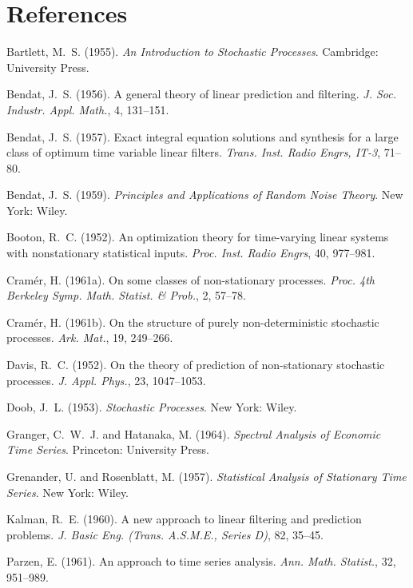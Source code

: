 \documentclass[11pt]{article}
\begin{document}
\section*{References}
\begin{thebibliography}{99}
Bartlett, M.~S. (1955). \emph{An Introduction to Stochastic Processes}. Cambridge: University Press.

Bendat, J.~S. (1956). A general theory of linear prediction and filtering. \emph{J. Soc. Industr. Appl. Math.}, 4, 131--151.

Bendat, J.~S. (1957). Exact integral equation solutions and synthesis for a large class of optimum time variable linear filters. \emph{Trans. Inst. Radio Engrs, IT-3}, 71--80.

Bendat, J.~S. (1959). \emph{Principles and Applications of Random Noise Theory}. New York: Wiley.

Booton, R.~C. (1952). An optimization theory for time-varying linear systems with nonstationary statistical inputs. \emph{Proc. Inst. Radio Engrs}, 40, 977--981.

Cramér, H. (1961a). On some classes of non-stationary processes. \emph{Proc. 4th Berkeley Symp. Math. Statist. \& Prob.}, 2, 57--78.

Cramér, H. (1961b). On the structure of purely non-deterministic stochastic processes. \emph{Ark. Mat.}, 19, 249--266.

Davis, R.~C. (1952). On the theory of prediction of non-stationary stochastic processes. \emph{J. Appl. Phys.}, 23, 1047--1053.

Doob, J.~L. (1953). \emph{Stochastic Processes}. New York: Wiley.

Granger, C.~W.~J. and Hatanaka, M. (1964). \emph{Spectral Analysis of Economic Time Series}. Princeton: University Press.

Grenander, U. and Rosenblatt, M. (1957). \emph{Statistical Analysis of Stationary Time Series}. New York: Wiley.

Kalman, R.~E. (1960). A new approach to linear filtering and prediction problems. \emph{J. Basic Eng. (Trans. A.S.M.E., Series D)}, 82, 35--45.

Parzen, E. (1961). An approach to time series analysis. \emph{Ann. Math. Statist.}, 32, 951--989.


\end{thebibliography}
\end{document}
